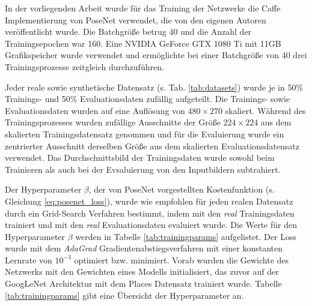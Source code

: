 

In der vorliegenden Arbeit wurde für das Training der Netzwerke die Caffe \cite{jiaCaffeConvolutionalArchitecture2014} Implementierung von PoseNet verwendet, die von den eigenen Autoren \citet{kendallPoseNetConvolutionalNetwork2015} veröffentlicht wurde. Die Batchgröße betrug 40 und die Anzahl der Trainingsepochen war 160. Eine NVIDIA GeForce GTX 1080 Ti mit 11GB Grafikspeicher wurde verwendet und ermöglichte bei einer Batchgröße von 40 drei Trainingsprozesse zeitgleich durchzuführen.

Jeder reale sowie synthetische Datensatz (s. Tab. \ref{tab:datasets}) wurde je in 50\% Trainings- und 50\% Evaluationsdaten zufällig aufgeteilt. Die Trainings- sowie Evaluationsdaten wurden auf eine Auflösung von $480\times270$ skaliert. Während des Trainingsprozesses wurden zufällige Ausschnitte der Größe $224 \times 224$ aus dem skalierten Trainingsdatensatz genommen und für die Evaluierung wurde ein zentrierter Ausschnitt derselben Größe aus dem skalierten Evaluationsdatensatz verwendet. Das Durchschnittsbild der Trainingsdaten wurde sowohl beim Trainieren als auch bei der Evsaluierung von den Inputbildern subtrahiert. 

Der Hyperparameter $\beta$, der von PoseNet vorgestellten Kostenfunktion (s. Gleichung \ref{eq:posenet_loss}), wurde wie empfohlen für jeden realen Datensatz durch ein Grid-Search Verfahren bestimmt, indem mit den \textit{real} Trainingsdaten trainiert und mit den \textit{real} Evaluationsdaten evaluiert wurde. Die Werte für den Hyperparameter $\beta$ werden in Tabelle \ref{tab:trainingparams} aufgelistet. Der Loss wurde mit dem \textit{AdaGrad} \cite{duchiAdaptiveSubgradientMethods2011} Gradientenabstiegsverfahren mit einer konstanten Lernrate von $10^{-3}$ optimiert bzw. minimiert. Vorab wurden die Gewichte des Netzwerks mit den Gewichten eines Modells initialisiert, das zuvor auf der GoogLeNet Architektur mit dem Places Datensatz trainiert wurde. Tabelle \ref{tab:trainingparams} gibt eine Übersicht der Hyperparameter an.

